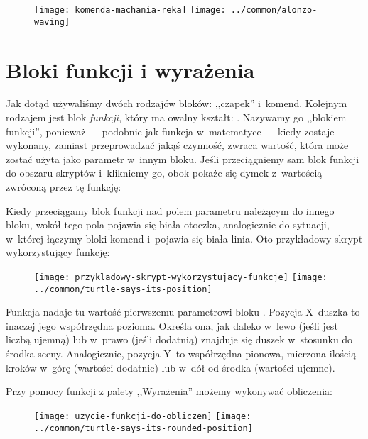 \documentclass{report}
\begin{document}
\begin{figure}[H]
\centering
\texttt{[image: komenda-machania-reka]}%
\hspace{2em}%
\texttt{[image: ../common/alonzo-waving]}
\end{figure}

\section{Bloki funkcji i wyrażenia}

Jak dotąd używaliśmy dwóch rodzajów bloków: ,,czapek'' i~komend. Kolejnym rodzajem jest blok \emph{funkcji}, który ma owalny kształt: . Nazywamy go ,,blokiem funkcji'', ponieważ --- podobnie jak funkcja w~matematyce --- kiedy zostaje wykonany, zamiast przeprowadzać jakąś czynność, zwraca wartość, która może zostać użyta jako parametr w~innym bloku. Jeśli przeciągniemy sam blok funkcji do obszaru skryptów i~klikniemy go, obok pokaże się dymek z~wartością zwróconą przez tę funkcję:


Kiedy przeciągamy blok funkcji nad polem parametru należącym do innego bloku, wokół tego pola pojawia się biała otoczka, analogicznie do sytuacji, w~której łączymy bloki komend i~pojawia się biała linia. Oto przykładowy skrypt wykorzystujący funkcję:

\begin{figure}[H]
\centering
\texttt{[image: przykladowy-skrypt-wykorzystujacy-funkcje]}%
\hspace{2em}%
\texttt{[image: ../common/turtle-says-its-position]}
\end{figure}

Funkcja  nadaje tu wartość pierwszemu parametrowi bloku . Pozycja X~duszka to inaczej jego współrzędna pozioma. Określa ona, jak daleko w~lewo (jeśli jest liczbą ujemną) lub w~prawo (jeśli dodatnią) znajduje się duszek w~stosunku do środka sceny. Analogicznie, pozycja Y~to współrzędna pionowa, mierzona ilością kroków w~górę (wartości dodatnie) lub w~dół od środka (wartości ujemne).

Przy pomocy funkcji z palety ,,Wyrażenia'' możemy wykonywać obliczenia:

\begin{figure}[H]
\centering
\texttt{[image: uzycie-funkcji-do-obliczen]}%
\hspace{2em}%
\texttt{[image: ../common/turtle-says-its-rounded-position]}
\end{figure}
\end{document}
